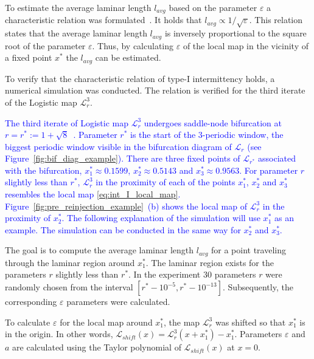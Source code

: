 To estimate the average laminar length $l_{avg}$ based on the parameter $\varepsilon$ a characteristic relation was formulated~\cite{Elaskar2017}.
It holds that $l_{avg} \propto 1/\sqrt{\varepsilon}$.
This relation states that the average laminar length $l_{avg}$ is inversely proportional to the square root of the parameter $\varepsilon$.
Thus, by calculating $\varepsilon$ of the local map in the vicinity of a fixed point $x^{*}$ the $l_{avg}$ can be estimated.
\par
To verify that the characteristic relation of type-I intermittency holds, a numerical simulation was conducted.
The relation is verified for the third iterate of the Logistic map $\mathcal{L}_{r}^{3}$.
\par
\textcolor{blue}{
The third iterate of Logistic map $\mathcal{L}_{r}^{3}$ undergoes saddle-node bifurcation at $r = r^{*} := 1+\sqrt{8}$~\cite{Elaskar2022,Gordon20180411}.
Parameter $r^{*}$ is the start of the $3$-periodic window, the biggest periodic window visible in the bifurcation diagram of $\mathcal{L}_{r}$ (see Figure~\ref{fig:bif_diag_example}).
There are three fixed points of $\mathcal{L}_{r^{*}}$ associated with the bifurcation, $x^{*}_{1} \approx 0.1599$, $x^{*}_{2} \approx 0.5143$ and $x^{*}_{3} \approx 0.9563$.
For parameter $r$ slightly less than $r^{*}$, $\mathcal{L}_{r}^{3}$ in the proximity of each of the points $x^{*}_{1}$, $x^{*}_{2}$ and $x^{*}_{3}$ resembles the local map \eqref{eq:int_I_local_map}.
Figure~\ref{fig:pre_reinjection_example}~(b) shows the local map of $\mathcal{L}_{r}^{3}$ in the proximity of $x^{*}_{2}$.
The following explanation of the simulation will use $x^{*}_{1}$ as an example.
The simulation can be conducted in the same way for $x^{*}_{2}$ and $x^{*}_{3}$.
}
\par
The goal is to compute the average laminar length $l_{avg}$ for a point traveling through the laminar region around $x^{*}_{1}$.
The laminar region exists for the parameters $r$ slightly less than $r^{*}$.
In the experiment $30$ parameters $r$ were randomly chosen from the interval $[ r^{*}-10^{-5}, r^{*}-10^{-13} ]$.
Subsequently, the corresponding $\varepsilon$ parameters were calculated.
\par
To calculate $\varepsilon$ for the local map around $x^{*}_{1}$, the map $\mathcal{L}_{r}^{3}$ was shifted so that $x^{*}_{1}$ is in the origin.
In other words, $\mathcal{L}_{shift}(x) = \mathcal{L}_{r}^{3}(x + x^{*}_{1}) - x^{*}_{1}$.
Parameters $\varepsilon$ and $a$ are calculated using the Taylor polynomial of $\mathcal{L}_{shift}(x)$ at $x = 0$.
